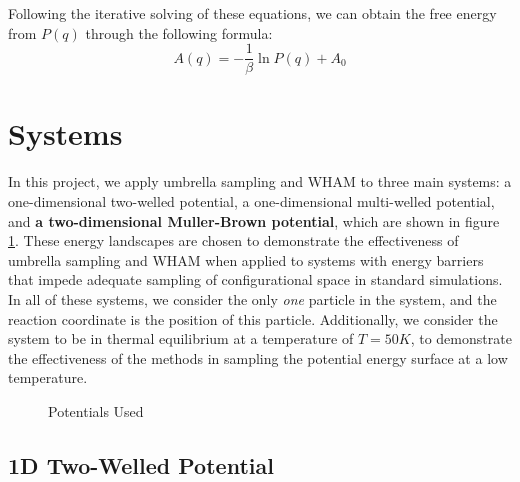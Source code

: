 \documentclass{article}
\begin{document}
Following the iterative solving of these equations, we can obtain the free energy from $P(q)$ through the following formula:
$$ A(q) = -\frac{1}{\beta} \ln P(q) + A_0 $$


\section{Systems}
In this project, we apply umbrella sampling and WHAM to three main systems: a one-dimensional two-welled potential, a one-dimensional multi-welled potential, and \textbf{a two-dimensional Muller-Brown potential}, which are shown in figure \ref{fig:system_pots}. These energy landscapes are chosen to demonstrate the effectiveness of umbrella sampling and WHAM when applied to systems with energy barriers that impede adequate sampling of configurational space in standard simulations. In all of these systems, we consider the only \textit{one} particle in the system, and the reaction coordinate is the position of this particle. Additionally, we consider the system to be in thermal equilibrium at a temperature of $T = 50K$, to demonstrate the effectiveness of the methods in sampling the potential energy surface at a low temperature.

\begin{figure}[h]%
    \centering
    \qquad
    \caption{Potentials Used}%
    \label{fig:system_pots}%
\end{figure}

\subsection{1D Two-Welled Potential}
\end{document}
